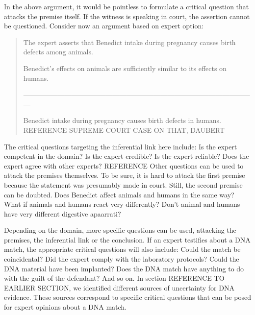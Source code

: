 \documentclass[10pt]{article}
\begin{document}
In the above argument, it would be pointless to formulate a critical question that attacks the premise 
itself. If the witness is speaking in court, the assertion cannot be questioned. Consider now an argument
 based on expert option:
\begin{quote}
The expert asserts that Benedict intake during pregnancy causes birth defects among animals.

Benedict's effects on animals are sufficiently similar to its effects on humans.

------------------------------------------------------------------------------------------------------
 
Benedict intake during pregnancy causes birth defects in humans. REFERENCE SUPREME COURT CASE ON THAT, DAUBERT
\end{quote}
%
The critical questions targeting the inferential link here include: Is the expert competent in the domain? Is the expert credible? Is the expert reliable? Does the expert agree with other experts? REFERENCE Other questions can be used to attack the premises themselves. To be sure, it is hard to attack the first premise because the statement was presumably made in court. Still, the second premise can be doubted. Does 
Benedict affect animals and humans in the same way?  What if animals and humans react very differently? Don't animal and humans have very different digestive apaarrati?

Depending on the domain, more specific questions can be used, attacking the premises, the inferential link or the conclusion. If an expert testifies about a DNA match, the appropriate critical questions will also include: Could the match be coincidental? Did the expert comply with the laboratory protocols? Could the DNA material have been implanted?  Does the DNA match have anything to do with the guilt of the defendant? And so on. In section REFERENCE TO EARLIER SECTION, we identified different sources of uncertainty for DNA evidence. These sources correspond to specific critical questions that can be posed for expert opinions about a DNA match.  
\end{document}
